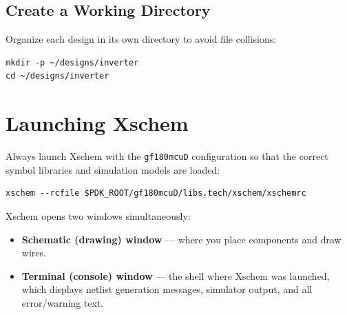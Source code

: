 \documentclass[11pt]{article}
\begin{document}
\subsection{Create a Working Directory}

Organize each design in its own directory to avoid file collisions:

\begin{lstlisting}
mkdir -p ~/designs/inverter
cd ~/designs/inverter
\end{lstlisting}

\section{Launching Xschem}
\label{sec:launching-xschem}

Always launch Xschem with the \texttt{gf180mcuD} configuration so that
the correct symbol libraries and simulation models are loaded:

\begin{lstlisting}
xschem --rcfile $PDK_ROOT/gf180mcuD/libs.tech/xschem/xschemrc
\end{lstlisting}

Xschem opens two windows simultaneously:

\begin{itemize}[leftmargin=2em]
  \item \textbf{Schematic (drawing) window} --- where you place
        components and draw wires.
  \item \textbf{Terminal (console) window} --- the shell where Xschem
        was launched, which displays netlist generation messages,
        simulator output, and all error/warning text.
\end{itemize}
\end{document}
